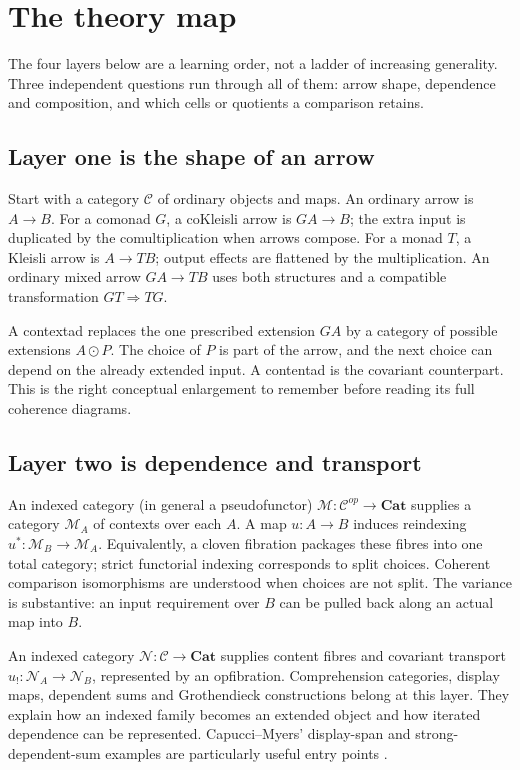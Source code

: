 \documentclass[11pt,letterpaper]{article}
\newcommand{\Cat}{\mathbf{Cat}}
\newcommand{\ext}{\mathbin{\odot}}
\begin{document}
\newpage
\tableofcontents
\newpage

\section{The theory map}
\label{sec:map}
The four layers below are a learning order, not a ladder of increasing generality. Three independent questions run through all of them: arrow shape, dependence and composition, and which cells or quotients a comparison retains.

\subsection{Layer one is the shape of an arrow}
Start with a category $\mathcal C$ of ordinary objects and maps. An ordinary arrow is $A\to B$. For a comonad $G$, a coKleisli arrow is $GA\to B$; the extra input is duplicated by the comultiplication when arrows compose. For a monad $T$, a Kleisli arrow is $A\to TB$; output effects are flattened by the multiplication. An ordinary mixed arrow $GA\to TB$ uses both structures and a compatible transformation $GT\Rightarrow TG$.

A contextad replaces the one prescribed extension $GA$ by a category of possible extensions $A\ext P$. The choice of $P$ is part of the arrow, and the next choice can depend on the already extended input. A contentad is the covariant counterpart. This is the right conceptual enlargement to remember before reading its full coherence diagrams.

\subsection{Layer two is dependence and transport}
An indexed category (in general a pseudofunctor) $\mathcal M:\mathcal C^{op}\to\Cat$ supplies a category $\mathcal M_A$ of contexts over each $A$. A map $u:A\to B$ induces reindexing $u^*:\mathcal M_B\to\mathcal M_A$. Equivalently, a cloven fibration packages these fibres into one total category; strict functorial indexing corresponds to split choices. Coherent comparison isomorphisms are understood when choices are not split. The variance is substantive: an input requirement over $B$ can be pulled back along an actual map into $B$.

An indexed category $\mathcal N:\mathcal C\to\Cat$ supplies content fibres and covariant transport $u_!:\mathcal N_A\to\mathcal N_B$, represented by an opfibration. Comprehension categories, display maps, dependent sums and Grothendieck constructions belong at this layer. They explain how an indexed family becomes an extended object and how iterated dependence can be represented. Capucci--Myers' display-span and strong-dependent-sum examples are particularly useful entry points \cite[Examples 3.20--3.21]{CM}.
\end{document}
